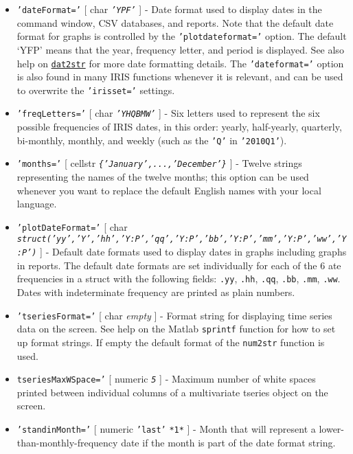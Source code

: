 \begin{itemize}
\item
  \texttt{'dateFormat='} {[} char \textbar{} \emph{\texttt{'YPF'}} {]} -
  Date format used to display dates in the command window, CSV
  databases, and reports. Note that the default date format for graphs
  is controlled by the \texttt{'plotdateformat='} option. The default
  `YFP' means that the year, frequency letter, and period is displayed.
  See also help on \href{dates/dat2str}{\texttt{dat2str}} for more date
  formatting details. The \texttt{'dateformat='} option is also found in
  many IRIS functions whenever it is relevant, and can be used to
  overwrite the \texttt{'irisset='} settings.
\item
  \texttt{'freqLetters='} {[} char \textbar{} \emph{\texttt{'YHQBMW'}}
  {]} - Six letters used to represent the six possible frequencies of
  IRIS dates, in this order: yearly, half-yearly, quarterly, bi-monthly,
  monthly, and weekly (such as the \texttt{'Q'} in \texttt{'2010Q1'}).
\item
  \texttt{'months='} {[} cellstr \textbar{}
  \emph{\texttt{\{'January',...,'December'\}}} {]} - Twelve strings
  representing the names of the twelve months; this option can be used
  whenever you want to replace the default English names with your local
  language.
\item
  \texttt{'plotDateFormat='} {[} char \textbar{}
  \emph{\texttt{struct('yy','Y','hh','Y:P','qq','Y:P','bb','Y:P','mm','Y:P','ww','Y:P')}}
  {]} - Default date formats used to display dates in graphs including
  graphs in reports. The default date formats are set individually for
  each of the 6 ate frequencies in a struct with the following fields:
  \texttt{.yy}, \texttt{.hh}, \texttt{.qq}, \texttt{.bb}, \texttt{.mm},
  \texttt{.ww}. Dates with indeterminate frequency are printed as plain
  numbers.
\item
  \texttt{'tseriesFormat='} {[} char \textbar{} \emph{empty} {]} -
  Format string for displaying time series data on the screen. See help
  on the Matlab \texttt{sprintf} function for how to set up format
  strings. If empty the default format of the \texttt{num2str} function
  is used.
\item
  \texttt{tseriesMaxWSpace='} {[} numeric \textbar{} \emph{\texttt{5}}
  {]} - Maximum number of white spaces printed between individual
  columns of a multivariate tseries object on the screen.
\item
  \texttt{'standinMonth='} {[} numeric \textbar{} \texttt{'last'}
  \textbar{} \texttt{*1*} {]} - Month that will represent a
  lower-than-monthly-frequency date if the month is part of the date
  format string.
\end{itemize}

